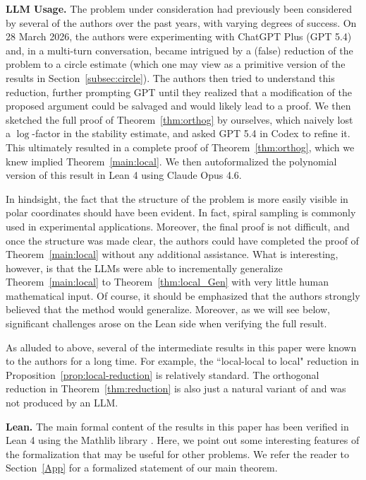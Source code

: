 \documentclass[11pt]{amsart}
\theoremstyle{remark}
\begin{document}
\textbf{LLM Usage.} The problem under consideration had previously been considered by several of the authors over the past years, with varying degrees of success. On 28 March 2026, the authors were experimenting with ChatGPT Plus (GPT 5.4) and, in a multi-turn conversation, became intrigued by a (false) reduction of the problem to a circle estimate (which one may view as a primitive version of the results in Section~\ref{subsec:circle}). The authors then tried to understand this reduction, further prompting GPT until they realized that a modification of the proposed argument could be salvaged and would likely lead to a proof. We then sketched the full proof of Theorem~\ref{thm:orthog} by ourselves, which naively lost a $\log$-factor in the stability estimate, and asked GPT 5.4 in Codex to refine it. This ultimately resulted in a complete proof of Theorem~\ref{thm:orthog}, which we knew implied Theorem~\ref{main:local}. We then autoformalized the polynomial version of this result in Lean 4 using Claude Opus 4.6. 
 \vspace{0.5em}


In hindsight, the fact that the structure of the problem is more easily visible in polar coordinates should have been evident. In fact, spiral sampling is commonly used in experimental applications. Moreover, the final proof is not difficult, and once the structure was made clear, the authors could have completed the proof of  Theorem~\ref{main:local} without any additional assistance. What is interesting, however, is that the LLMs were able to incrementally generalize Theorem~\ref{main:local} to Theorem~\ref{thm:local_Gen} with very little human mathematical input. Of course, it should be emphasized that the authors strongly believed that the method would generalize. Moreover, as we will see below, significant challenges arose on the Lean side when verifying the full result.
 \vspace{0.5em}

As alluded to above, several of the intermediate results in this paper were known to the authors for a long time. For example, the ``local-local to local" reduction in Proposition~\ref{prop:local-reduction} is relatively standard. The orthogonal reduction in Theorem~\ref{thm:reduction}  is also just a natural variant of \cite[Theorem 3.10]{MR4800909} and was not produced by an LLM.
 \vspace{0.5em}

\textbf{Lean.} The main formal content of the results in this paper has been verified in Lean 4 \cite{lean4} using the Mathlib library \cite{mathlib2020}.  Here, we point out some interesting features of the formalization that may be useful for other problems. We refer the reader to Section~\ref{App} for a formalized statement of our main theorem.
 \vspace{0.5em}
\end{document}
